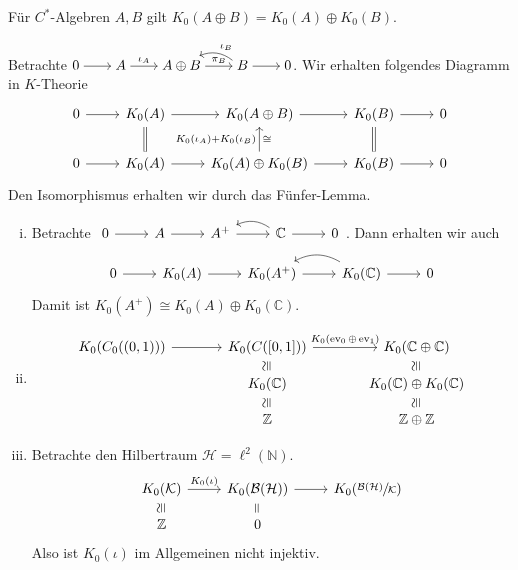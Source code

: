 \begin{korollar}[{name=[{$K_0$ von der direkten Summe}]}]
	Für $C^*$-Algebren $A,B$ gilt $K_0(A \oplus B) = K_0(A) \oplus K_0(B)$.
\end{korollar}
\begin{beweis}
	Betrachte \(
		\begin{tikzcd}[cramped,sep=2em]
			0 \rar & A \rar["\iota_A"] & A \oplus B \rar["\pi_B"] & B \lar[bend right,"\iota_B"'] \rar & 0
		\end{tikzcd}
	\).
	Wir erhalten folgendes Diagramm in $K$-Theorie
	\[
		\begin{tikzcd}
			0 \rar & K_0(A)\dar[equal]  \rar & K_0(A \oplus B) \rar & K_0(B) \dar[equal] \rar & 0 \\
			0 \rar & K_0(A) \rar & K_0(A) \oplus K_0(B) \uar["K_0(\iota_A) + K_0(\iota_B)","\cong"'] \rar & K_0(B) \rar & 0
		\end{tikzcd}
	\]
	Den Isomorphismus erhalten wir durch das Fünfer-Lemma.
\end{beweis}

\begin{beispiel}
	\begin{enumerate}[(i)]
		\item Betrachte \(
			\begin{tikzcd}
				0 \rar & A \rar & A^+ \rar & \mathbb{C} \lar[bend right] \rar & 0
			\end{tikzcd}
		\). Dann erhalten wir auch
		\[
			\begin{tikzcd}
				0 \rar & K_0(A) \rar & K_0(A^+) \rar & K_0(\mathbb{C}) \rar \lar[bend right] & 0
			\end{tikzcd}
		\]
		Damit ist $K_0(A^+) \cong K_0(A) \oplus K_0(\mathbb{C})$.
		\item 
		\[
			\begin{tikzcd}[column sep=large,row sep =small]
				K_0\enbrace*{C_0 \enbrace*{(0,1)}} \rar & K_0 \enbrace*{C \enbrace*{[0,1]}} \rar["K_0(\ev_0 \oplus \ev_1)"] & K_0(\mathbb{C} \oplus \mathbb{C}) \\
				& K_0(\mathbb{C}) \uar[phantom,sloped,"\cong"'] & K_0(\mathbb{C}) \oplus K_0(\mathbb{C}) \uar[phantom,sloped,"\cong"']\\
				& \mathbb{Z}  \uar[phantom,sloped,"\cong"']& \mathbb{Z}\oplus \mathbb{Z} \uar[phantom,sloped,"\cong"']
			\end{tikzcd}
		\]
		\item Betrachte den Hilbertraum $\mathcal{H} = \ell^2(\mathbb{N})$.
		\[
			\begin{tikzcd}[row sep=small]
				K_0(\mathcal{K}) \rar["K_0(\iota)"] & K_0(\mathcal{B}(\mathcal{H})) \rar & K_0 \enbrace*{\sfrac{\mathcal{B}(\mathcal{H})}{\mathcal{K}}} \\
				\mathbb{Z} \uar[phantom,sloped,"\cong"'] & 0 \uar[phantom,sloped,"="']
			\end{tikzcd}
		\]
		Also ist $K_0(\iota)$ im Allgemeinen nicht injektiv.
	\end{enumerate}
\end{beispiel}

